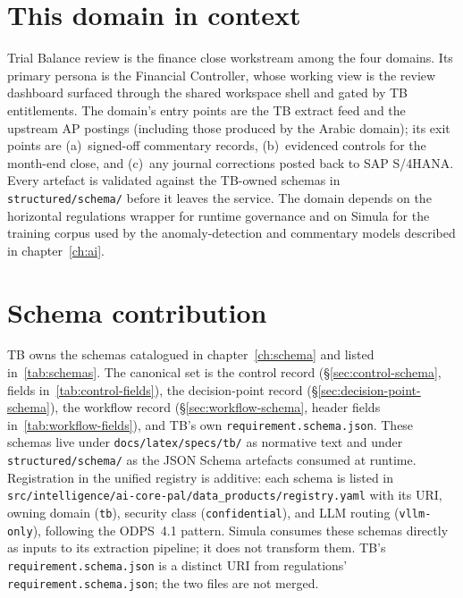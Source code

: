 \documentclass[11pt,a4paper,twoside]{report}
\begin{document}
\section{This domain in context}
\label{sec:agent-domain-context}
Trial Balance review is the finance close workstream among the four
domains. Its primary persona is the Financial Controller, whose
working view is the review dashboard surfaced through the shared
workspace shell and gated by TB entitlements. The domain's entry
points are the TB extract feed and the upstream AP postings
(including those produced by the Arabic domain); its exit points are
(a)~signed-off commentary records, (b)~evidenced controls for the
month-end close, and (c)~any journal corrections posted back to SAP
S/4HANA. Every artefact is validated against the TB-owned schemas in
\texttt{structured/schema/} before it leaves the service. The domain
depends on the horizontal regulations wrapper for runtime governance
and on Simula for the training corpus used by the anomaly-detection
and commentary models described in chapter~\ref{ch:ai}.

\section{Schema contribution}
\label{sec:agent-schema-contrib}
TB owns the schemas catalogued in chapter~\ref{ch:schema} and listed
in~\ref{tab:schemas}. The canonical set is the control record
(\S\ref{sec:control-schema}, fields in~\ref{tab:control-fields}), the
decision-point record (\S\ref{sec:decision-point-schema}), the
workflow record (\S\ref{sec:workflow-schema},
header fields in~\ref{tab:workflow-fields}), and TB's own
\texttt{requirement.schema.json}. These schemas live under
\texttt{docs/latex/specs/tb/} as normative text and under
\texttt{structured/schema/} as the JSON Schema artefacts consumed at
runtime. Registration in the unified registry is additive: each
schema is listed in
\texttt{src/intelligence/ai-core-pal/data\_products/registry.yaml}
with its URI, owning domain (\texttt{tb}), security class
(\texttt{confidential}), and LLM routing (\texttt{vllm-only}),
following the ODPS~4.1 pattern. Simula consumes these schemas
directly as inputs to its extraction pipeline; it does not transform
them. TB's \texttt{requirement.schema.json} is a distinct URI from
regulations' \texttt{requirement.schema.json}; the two files are not
merged.
\end{document}
